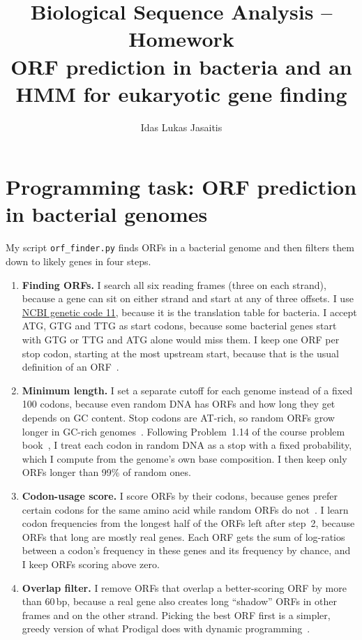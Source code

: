 \documentclass[10pt,a4paper]{article}
\title{\vspace{-1.5cm}Biological Sequence Analysis -- Homework\\
       \large ORF prediction in bacteria and an HMM for eukaryotic gene finding}
\author{Idas Lukas Jasaitis}
\begin{document}
\maketitle



\section{Programming task: ORF prediction in bacterial genomes}
My script \texttt{orf\_finder.py} finds ORFs in a bacterial genome and then filters them
down to likely genes in four steps.

\begin{enumerate}
\item \textbf{Finding ORFs.} I search all six reading frames (three on each strand),
  because a gene can sit on either strand and start at any of three offsets. I use
  \href{https://www.ncbi.nlm.nih.gov/Taxonomy/Utils/wprintgc.cgi\#SG11}{NCBI genetic code 11},
  because it is the translation table for bacteria. I accept ATG, GTG and TTG as start
  codons, because some bacterial genes start with GTG or TTG and ATG alone would miss them.
  I keep one ORF per stop codon, starting at the most upstream start, because that is the
  usual definition of an ORF~\cite[\S3.5]{durbin1998}.

\item \textbf{Minimum length.} I set a separate cutoff for each genome instead of a fixed
  100 codons, because even random DNA has ORFs and how long they get depends on GC content.
  Stop codons are AT-rich, so random ORFs grow longer in GC-rich genomes~\cite{krogh_notes}.
  Following Problem~1.14 of the course problem book~\cite{borodovsky2006}, I treat each codon
  in random DNA as a stop with a fixed probability, which I compute from the genome's own
  base composition. I then keep only ORFs longer than 99\% of random ones.

\item \textbf{Codon-usage score.} I score ORFs by their codons, because genes prefer
  certain codons for the same amino acid while random ORFs do not~\cite[\S3.5]{durbin1998}.
  I learn codon frequencies from the longest half of the ORFs left after step~2, because
  ORFs that long are mostly real genes. Each ORF gets the sum of log-ratios between a
  codon's frequency in these genes and its frequency by chance, and I keep ORFs scoring
  above zero.

\item \textbf{Overlap filter.} I remove ORFs that overlap a better-scoring ORF by more than
  60\,bp, because a real gene also creates long ``shadow'' ORFs in other frames and on the
  other strand. Picking the best ORF first is a simpler, greedy version of what Prodigal
  does with dynamic programming~\cite{larralde2022}.
\end{enumerate}
\end{document}
